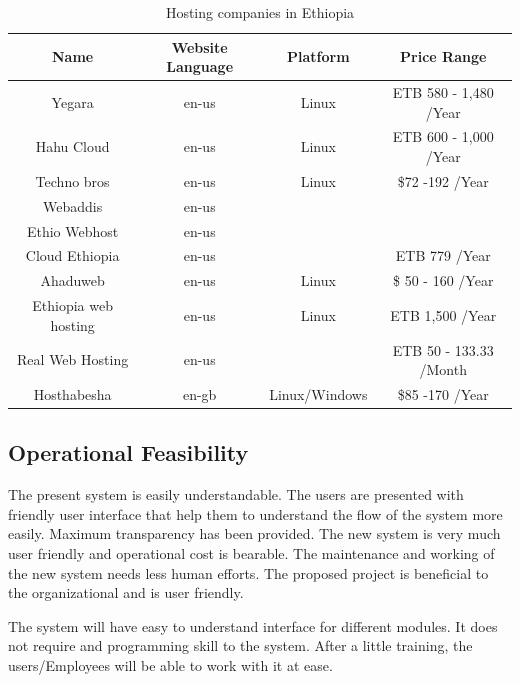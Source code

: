 \begin{table}[!hb]
\centering
\begin{tabular}{|c|c|c|c|}
\hline 
\rule[-1ex]{0pt}{2.5ex} \textbf{Name} & \textbf{Website Language} & \textbf{Platform} & \textbf{Price Range} \\ 
\hline 
\rule[-1ex]{0pt}{2.5ex} Yegara & en-us & Linux & ETB 580 - 1,480 /Year \\ 
\hline 
\rule[-1ex]{0pt}{2.5ex} Hahu Cloud & en-us & Linux & ETB 600 - 1,000 /Year \\ 
\hline 
\rule[-1ex]{0pt}{2.5ex} Techno bros & en-us & Linux & \$72 -192 /Year \\ 
\hline 
\rule[-1ex]{0pt}{2.5ex} Webaddis & en-us &  &  \\ 
\hline 
\rule[-1ex]{0pt}{2.5ex} Ethio Webhost & en-us &  &  \\ 
\hline 
\rule[-1ex]{0pt}{2.5ex} Cloud Ethiopia & en-us &  & ETB 779 /Year \\ 
\hline 
\rule[-1ex]{0pt}{2.5ex} Ahaduweb & en-us & Linux & \$ 50 - 160 /Year \\ 
\hline
\rule[-1ex]{0pt}{2.5ex} Ethiopia web hosting & en-us & Linux & ETB 1,500 /Year \\ 
\hline 
\rule[-1ex]{0pt}{2.5ex} Real Web Hosting & en-us &  & ETB 50 - 133.33 /Month  \\
\hline
\rule[-1ex]{0pt}{2.5ex} Hosthabesha & en-gb & Linux/Windows  & \$85 -170 /Year  \\ 
\hline 
\end{tabular} 
\caption{Hosting companies in Ethiopia}
\end{table}

\subsection{Operational Feasibility}
The present system is easily understandable. The users are presented with friendly user interface that help them to understand the flow of the system more easily. Maximum transparency has been provided. The new system is very much user friendly and operational cost is bearable. The maintenance and working of the new system needs less human efforts. The proposed project is beneficial to the organizational and is user friendly.

The system will have easy to understand interface for different modules. It does not require and programming skill to the system. After a little training, the users/Employees will be able to work with it at ease.

